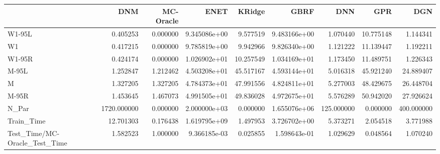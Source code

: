 \begin{tabular}{lrrrrrrrr}
\toprule
{} &          DNM &  MC-Oracle &          ENET &     KRidge &          GBRF &         DNN &        GPR &         DGN \\
\midrule
W1-95L                        &     0.405253 &   0.000000 &  9.345086e+00 &   9.577519 &  9.483166e+00 &    1.070440 &  10.775148 &    1.144341 \\
W1                            &     0.417215 &   0.000000 &  9.785819e+00 &   9.942966 &  9.826340e+00 &    1.121222 &  11.139447 &    1.192211 \\
W1-95R                        &     0.424174 &   0.000000 &  1.026902e+01 &  10.257549 &  1.034169e+01 &    1.173450 &  11.489751 &    1.226343 \\
M-95L                         &     1.252847 &   1.212462 &  4.503208e+01 &  45.517167 &  4.593144e+01 &    5.016318 &  45.921240 &   24.889407 \\
M                             &     1.327205 &   1.327205 &  4.784373e+01 &  47.991556 &  4.824811e+01 &    5.277003 &  48.429675 &   26.448704 \\
M-95R                         &     1.453645 &   1.467073 &  4.991505e+01 &  49.836028 &  4.972675e+01 &    5.576289 &  50.942020 &   27.926624 \\
N\_Par                         &  1720.000000 &   0.000000 &  2.000000e+03 &   0.000000 &  1.655076e+06 &  125.000000 &   0.000000 &  400.000000 \\
Train\_Time                    &    12.701303 &   0.176438 &  1.619795e+09 &   1.497953 &  3.726702e+00 &    5.373271 &   2.054518 &    3.771988 \\
Test\_Time/MC-Oracle\_Test\_Time &     1.582523 &   1.000000 &  9.366185e-03 &   0.025855 &  1.598643e-01 &    1.029629 &   0.048564 &    1.070240 \\
\bottomrule
\end{tabular}

